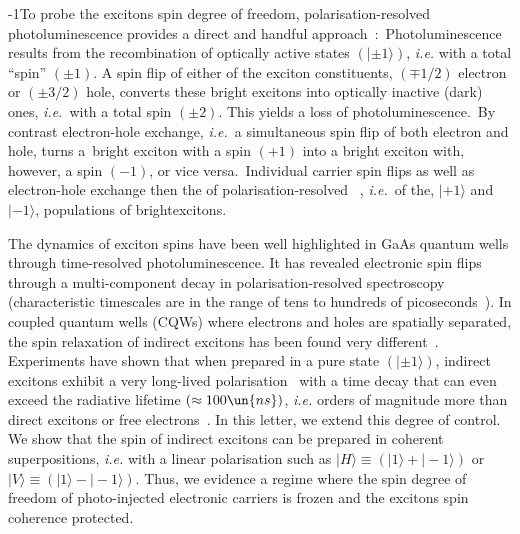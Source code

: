 \documentclass[doublecol,final]{epl2}
\begin{document}
\looseness-1To probe the excitons spin degree of freedom, polarisation-resolved photoluminescence provides a direct and handful approach~\cite{epl17031bib1,epl17031bib2,epl17031bib3}:~Photoluminescence results from the recombination of optically active states $(|\pm1\rangle)$, \textit{i.e.} with a total ``spin'' $(\pm 1)$. A spin flip of either of the exciton constituents, $(\mp 1/2)$ electron or $(\pm 3/2)$ hole, converts these bright excitons into optically inactive (dark) ones, \textit{i.e.}~with a total spin $(\pm 2)$. This yields a loss of photoluminescence.~By contrast electron-hole exchange, \textit{i.e.}~a simultaneous spin flip of both electron and hole, turns a~bright exciton with a spin $(+1)$ into a bright exciton with, however, a spin $(-1)$, or vice versa.~Individual carrier spin flips as well as electron-hole exchange then  the  of polarisation-resolved ~\cite{epl17031bib1}, \textit{i.e.}~of the, $|+1\rangle$ and $|-1\rangle$, populations of bright\break excitons.

The dynamics of exciton spins have been well highlighted in GaAs quantum wells through time-resolved photoluminescence. It has revealed electronic spin flips through a multi-component decay in polarisation-resolved spectroscopy (characteristic timescales are in the range of tens to hundreds of picoseconds~\cite{epl17031bib1,epl17031bib2,epl17031bib3,epl17031bib5}). In coupled quantum wells (CQWs) where electrons and holes are spatially separated, the spin relaxation of indirect excitons has been found very different~\cite{epl17031bib11,epl17031bib12,epl17031bib13}. Experiments have shown that when prepared in a pure state $(|\pm1\rangle)$, indirect excitons exhibit a very long-lived polarisation~\cite{epl17031bib14} with a time decay that can even exceed the radiative lifetime $(\approx 100\un{ns})$, \textit{i.e.} orders of magnitude more than direct excitons or free electrons~\cite{epl17031bib15}. In this letter, we extend this degree of control. We show that the spin of indirect excitons can be prepared in coherent superpositions, \textit{i.e.} with a linear polarisation such as $|H\rangle\equiv (|1\rangle+|-1\rangle)$ or $|V\rangle\equiv (|1\rangle-|-1\rangle)$. Thus, we evidence a regime where the spin degree of freedom of photo-injected electronic carriers is frozen and the excitons spin coherence protected.
\end{document}
